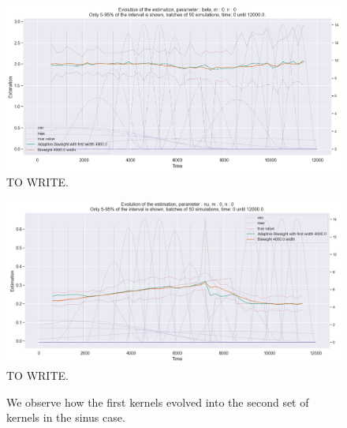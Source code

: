 \begin{figure}
\centering
\includegraphics[width = 0.90 \textwidth]{../imag/chap3/3/K.png}
\caption{TO WRITE.}
\label{fig:first_estimate_3_beta}
\end{figure}

\begin{figure}
\centering
\includegraphics[width = 0.90 \textwidth]{../imag/chap3/3/L.png}
\caption{TO WRITE.}
\label{fig:first_estimate_3_nu}
\end{figure}















\begin{figure}
\centering
{} 
\caption{We observe how the first kernels evolved into the second set of kernels in the sinus case.}
\label{fig:compar_kernels_4}
\end{figure}

